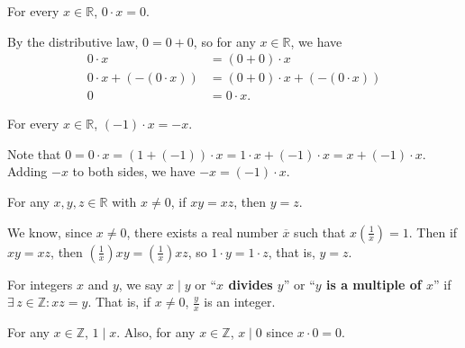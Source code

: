 \documentclass{notes}
\begin{document}
\begin{lem}
  For every $x \in \mathbb R$, $0 \cdot x = 0$.
\end{lem}

\begin{prf}
  By the distributive law, $0 = 0 + 0$, so for any $x \in \mathbb R$, we have 
  \begin{align*}
    0 \cdot x &= (0 + 0) \cdot x \\ 
    0 \cdot x + (-(0 \cdot x)) &= (0 + 0) \cdot x + (-(0 \cdot x)) \\ 
    0 &= 0 \cdot x.
  \end{align*}
\end{prf}

\begin{lem}
  For every $x \in \mathbb R$, $(-1) \cdot x = -x$.
\end{lem}

\begin{prf}
  Note that $0 = 0 \cdot x = (1 + (-1)) \cdot x = 1 \cdot x + (-1) \cdot x = x + (-1) \cdot x$.
  Adding $-x$ to both sides, we have $-x = (-1) \cdot x$.
\end{prf}

\begin{lem}
  For any $x, y, z \in \mathbb R$ with $x \neq 0$, if $x y = x z$, then $y = z$.
\end{lem}

\begin{prf}
  We know, since $x \neq 0$, there exists a real number $\overline x$ such that $x \left ( \frac{1}{x} \right ) = 1$.
  Then if $x y = x z$, then $\left ( \frac{1}{x} \right ) x y = \left ( \frac{1}{x} \right ) x z$, so $1 \cdot y = 1 \cdot z$, that is, $y = z$.
\end{prf}

\underline{}

\begin{defn}
  For integers $x$ and $y$, we say {\boldmath \bfseries $x \mid y$} or ``{\boldmath \bfseries $x$ divides $y$}'' or ``{\boldmath \bfseries $y$ is a multiple of $x$}'' if $\exists \, z \in \mathbb Z: x z = y$.
  That is, if $x \neq 0$, $\frac{y}{x}$ is an integer.
\end{defn}

\underline{} For any $x \in \mathbb Z$, $1 \mid x$.
Also, for any $x \in \mathbb Z$, $x \mid 0$ since $x \cdot 0 = 0$.
\end{document}

